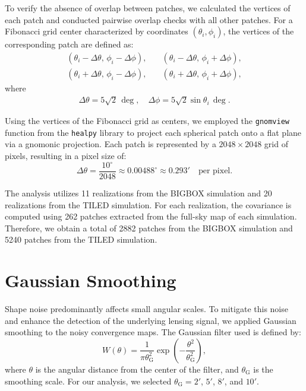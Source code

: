 To verify the absence of overlap between patches, we calculated the vertices of each patch and conducted pairwise overlap checks with all other patches. For a Fibonacci grid center characterized by coordinates \( (\theta_i, \phi_i) \), the vertices of the corresponding patch are defined as:
\begin{align}
    \left( \theta_i - \Delta \theta,\, \phi_i - \Delta \phi \right), \quad &\left( \theta_i - \Delta \theta,\, \phi_i + \Delta \phi \right), \nonumber \\
    \left( \theta_i + \Delta \theta,\, \phi_i - \Delta \phi \right), \quad &\left( \theta_i + \Delta \theta,\, \phi_i + \Delta \phi \right),
\end{align}
where
\begin{align}
    \Delta \theta = 5\sqrt{2}\, \mathrm{\deg}, \quad \Delta \phi = 5\sqrt{2}\sin \theta_i \, \mathrm{\deg}.
\end{align}

Using the vertices of the Fibonacci grid as centers, we employed the \texttt{gnomview} function from the \texttt{healpy} library \citep{Zonca2019} to project each spherical patch onto a flat plane via a gnomonic projection. Each patch is represented by a $2048 \times 2048$ grid of pixels, resulting in a pixel size of:
\begin{equation}
    \Delta \theta = \frac{10^\circ}{2048} \approx 0.00488^\circ \approx 0.293' \quad \text{per pixel}.
\end{equation}

The analysis utilizes 11 realizations from the BIGBOX simulation and 20 realizations from the TILED simulation. For each realization, the covariance is computed using 262 patches extracted from the full-sky map of each simulation.
Therefore, we obtain a total of 2882 patches from the BIGBOX simulation and 5240 patches from the TILED simulation. 

\section{Gaussian Smoothing}
Shape noise predominantly affects small angular scales. To mitigate this noise and enhance the detection of the underlying lensing signal, we applied Gaussian smoothing to the noisy convergence maps. The Gaussian filter used is defined by:
\begin{equation}
    W(\theta) = \frac{1}{\pi \theta_{\mathrm{G}}^2} \exp\left( -\frac{\theta^2}{\theta_{\mathrm{G}}^2} \right),
\end{equation}
where $\theta$ is the angular distance from the center of the filter, and $\theta_{\mathrm{G}}$ is the smoothing scale. For our analysis, we selected $\theta_{\mathrm{G}} = 2'$, $5'$, $8'$, and $10'$.

